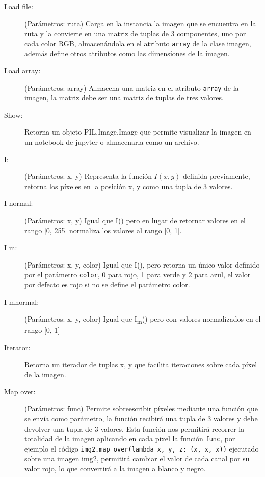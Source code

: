 \documentclass[letter]{article}
\begin{document}
\begin{description}
\item[{Load file:}] (Parámetros: ruta) Carga en la instancia la imagen que se
encuentra en la ruta y la convierte en una matriz de tuplas de 3 componentes,
uno por cada color RGB, almacenándola en el atributo \texttt{array} de la clase
imagen, además define otros atributos como las dimensiones de la imagen.

\item[{Load array:}] (Parámetros: array) Almacena una matriz en el atributo \texttt{array}
de la imagen, la matriz debe ser una matriz de tuplas de tres valores.

\item[{Show:}] Retorna un objeto PIL.Image.Image que permite visualizar la imagen en
un notebook de jupyter o almacenarla como un archivo.

\item[{I:}] (Parámetros: x, y) Representa la función \(I(x, y)\) definida previamente,
retorna los píxeles en la posición x, y como una tupla de 3 valores.

\item[{I normal:}] (Parámetros: x, y) Igual que I() pero en lugar de retornar
valores en el rango [0, 255] normaliza los valores al rango [0, 1].

\item[{I m:}] (Parámetros: x, y, color) Igual que I(), pero retorna un único valor
definido por el parámetro \texttt{color}, 0 para rojo, 1 para verde y 2 para azul, el
valor por defecto es rojo si no se define el parámetro color.

\item[{I mnormal:}] (Parámetros: x, y, color) Igual que I\textsubscript{m}() pero con valores
normalizados en el rango [0, 1]

\item[{Iterator:}] Retorna un iterador de tuplas x, y que facilita iteraciones
sobre cada píxel de la imagen.

\item[{Map over:}] (Parámetros: func) Permite sobreescribir píxeles mediante una
función que se envía como parámetro, la función recibirá una tupla de 3
valores y debe devolver una tupla de 3 valores. Esta función nos permitirá
recorrer la totalidad de la imagen aplicando en cada pixel la función \texttt{func},
por ejemplo el código \texttt{img2.map\_over(lambda x, y, z: (x, x, x))} ejecutado
sobre una imagen img2, permitirá cambiar el valor de cada canal por su valor
rojo, lo que convertirá a la imagen a blanco y negro.
\end{description}
\end{document}
